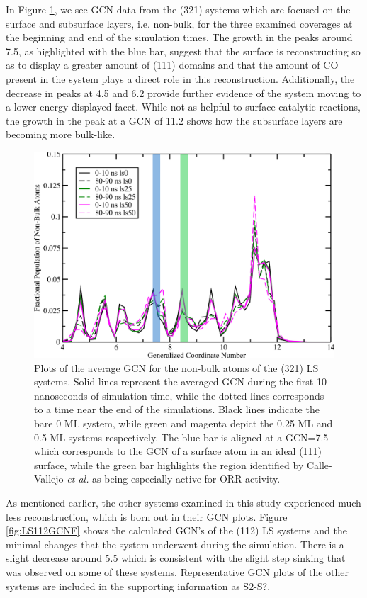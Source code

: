 In Figure \ref{fig:LS321GCNF}, we see GCN data from the  (321) systems
which are focused on the surface and subsurface layers, i.e. non-bulk, for the
three examined coverages at  the beginning and end of the simulation times. The
growth in the peaks around 7.5, as highlighted with the blue bar, suggest that
the surface is reconstructing so as to display a greater amount of (111)
domains and that the amount of CO present in the system plays a direct role in
this reconstruction. Additionally, the decrease in peaks at 4.5 and 6.2 provide
further evidence of the system moving to a lower energy displayed facet. While
not as helpful to surface catalytic reactions, the growth in the peak at a GCN
of 11.2 shows how the subsurface layers are becoming more bulk-like.

\begin{figure}[p!]
  \includegraphics[width=\linewidth]{../figures/chap4/321ls_GCNF.pdf}
  \caption{Plots of the average GCN for the non-bulk atoms of the  (321)
LS systems.  Solid lines represent the averaged GCN during the first 10
nanoseconds of simulation time, while the dotted lines corresponds to a time near
the end of the simulations. Black lines indicate the bare 0 ML system, while
green and magenta depict the 0.25 ML and 0.5 ML systems respectively. The blue
bar is aligned at a GCN=7.5 which corresponds to the GCN of a surface atom in
an ideal  (111) surface, while the green bar highlights the region
identified by Calle-Vallejo {\em et al.} as being especially active for ORR
activity.\citep{Calle-Vallejo:2015qq}}
\label{fig:LS321GCNF}
\end{figure}

As mentioned earlier, the other systems examined in this study experienced much
less reconstruction, which is born out in their GCN plots. Figure
\ref{fig:LS112GCNF} shows the calculated GCN's of the  (112) LS
systems and the minimal changes that the system underwent during the
simulation. There is a slight decrease around 5.5 which is consistent with the
slight step sinking that was observed on some of these systems. Representative GCN plots
of the other systems are included in the supporting information as S2-S?.

